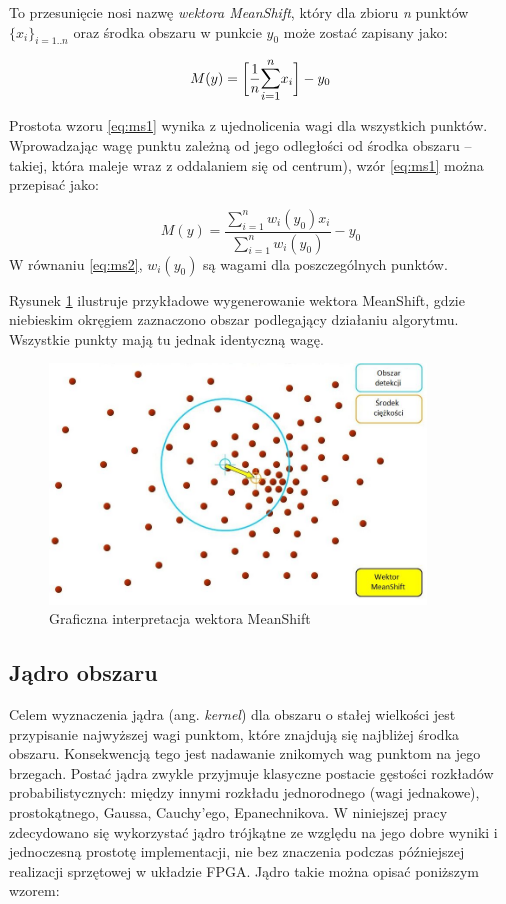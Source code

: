 To przesunięcie nosi nazwę \textit{wektora MeanShift}, który dla zbioru \textit{n} punktów $\{x_{i}\}_{i=1..n}$ oraz środka obszaru w punkcie $y_0$ może zostać zapisany jako:

\begin{equation}
\label{eq:ms1}
M(y)=\bigg[\frac{1}{n}\mathlarger{\sum\limits_{i=1}^{n}}x_i\bigg]-y_0
\end{equation}

Prostota wzoru \eqref{eq:ms1} wynika z ujednolicenia wagi dla wszystkich punktów. %
Wprowadzając wagę punktu zależną od jego odległości od środka obszaru -- takiej, która maleje wraz z oddalaniem się od centrum), wzór \eqref{eq:ms1} można przepisać jako:

\begin{equation}
\label{eq:ms2}
M(y)=\frac{\sum_{i=1}^{n}w_i(y_0)x_i}{\sum_{i=1}^{n}w_i(y_0)}-y_0
\end{equation}
W równaniu \eqref{eq:ms2}, $w_i(y_0)$ są wagami dla poszczególnych punktów.

Rysunek  \ref{fig:ms_vector} ilustruje przykładowe wygenerowanie wektora MeanShift, gdzie niebieskim okręgiem zaznaczono obszar podlegający działaniu algorytmu. 
Wszystkie punkty mają tu jednak identyczną wagę.
\begin{figure}[h]
	\centering
	\includegraphics[width=10cm]{2_meanshift.jpg}
	\caption{Graficzna interpretacja wektora MeanShift \cite{Egorov}}
	\label{fig:ms_vector}
\end{figure}

\subsection{Jądro obszaru}

Celem wyznaczenia jądra (ang. \textit{kernel}) dla obszaru o stałej wielkości jest przypisanie najwyższej wagi punktom, które znajdują się najbliżej środka obszaru. 
Konsekwencją tego jest nadawanie znikomych wag punktom na jego brzegach. %
Postać jądra zwykle przyjmuje klasyczne postacie gęstości rozkładów probabilistycznych: między innymi rozkładu jednorodnego (wagi jednakowe), prostokątnego, Gaussa, Cauchy'ego, Epanechnikova. 
W niniejszej pracy zdecydowano się wykorzystać jądro trójkątne ze względu na jego dobre wyniki i jednoczesną prostotę implementacji, nie bez znaczenia podczas późniejszej realizacji sprzętowej w układzie FPGA. 
Jądro takie można opisać poniższym wzorem:


